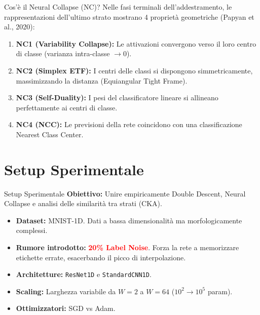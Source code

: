 \documentclass[aspectratio=169, 10pt]{beamer}
\begin{document}
\begin{frame}{Cos'è il Neural Collapse (NC)?}
    Nelle fasi terminali dell'addestramento, le rappresentazioni dell'ultimo strato mostrano 4 proprietà geometriche (Papyan et al., 2020):
    \vspace{0.3cm}
    \begin{enumerate}
        \item \textbf{NC1 (Variability Collapse):} Le attivazioni convergono verso il loro centro di classe (varianza intra-classe $\to 0$).
        \item \textbf{NC2 (Simplex ETF):} I centri delle classi si dispongono simmetricamente, massimizzando la distanza (Equiangular Tight Frame).
        \item \textbf{NC3 (Self-Duality):} I pesi del classificatore lineare si allineano perfettamente ai centri di classe.
        \item \textbf{NC4 (NCC):} Le previsioni della rete coincidono con una classificazione Nearest Class Center.
    \end{enumerate}
\end{frame}

\section{Setup Sperimentale}

\begin{frame}{Setup Sperimentale}
    \textbf{Obiettivo:} Unire empiricamente Double Descent, Neural Collapse e analisi delle similarità tra strati (CKA).
    
    \vspace{0.3cm}
    \begin{itemize}
        \item \textbf{Dataset:} MNIST-1D. Dati a bassa dimensionalità ma morfologicamente complessi.
        \item \textbf{Rumore introdotto:} \textcolor{red}{\textbf{20\% Label Noise}}. Forza la rete a memorizzare etichette errate, esacerbando il picco di interpolazione.
        \item \textbf{Architetture:} \texttt{ResNet1D} e \texttt{StandardCNN1D}.
        \item \textbf{Scaling:} Larghezza variabile da $W=2$ a $W=64$ ($10^2 \to 10^5$ param).
        \item \textbf{Ottimizzatori:} SGD vs Adam.
    \end{itemize}
\end{frame}
\end{document}
